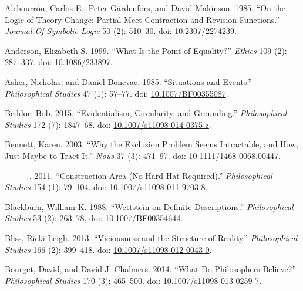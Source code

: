 \documentclass[
  10pt,
  letterpaper,
  DIV=11,
  numbers=noendperiod,
  twoside]{scrartcl}
\newlength{\cslhangindent}
\newenvironment{CSLReferences}[2] %
 {\begin{list}{}{%
  \setlength{\itemindent}{0pt}
  \setlength{\leftmargin}{0pt}
  \setlength{\parsep}{0pt}
  \ifodd #1
   \setlength{\leftmargin}{\cslhangindent}
   \setlength{\itemindent}{-1\cslhangindent}
  \fi
  \setlength{\itemsep}{#2\baselineskip}}}
 {\end{list}}
\begin{document}
\label{refs}
\begin{CSLReferences}{1}{0}
Alchourrón, Carlos E., Peter Gärdenfors, and David Makinson. 1985. {``On
the Logic of Theory Change: Partial Meet Contraction and Revision
Functions.''} \emph{Journal Of Symbolic Logic} 50 (2): 510--30. doi:
\href{https://doi.org/10.2307/2274239}{10.2307/2274239}.

Anderson, Elizabeth S. 1999. {``What Is the Point of Equality?''}
\emph{Ethics} 109 (2): 287--337. doi:
\href{https://doi.org/10.1086/233897}{10.1086/233897}.

Asher, Nicholas, and Daniel Bonevac. 1985. {``Situations and Events.''}
\emph{Philosophical Studies} 47 (1): 57--77. doi:
\href{https://doi.org/10.1007/BF00355087}{10.1007/BF00355087}.

Beddor, Bob. 2015. {``Evidentialism, Circularity, and Grounding.''}
\emph{Philosophical Studies} 172 (7): 1847--68. doi:
\href{https://doi.org/10.1007/s11098-014-0375-z}{10.1007/s11098-014-0375-z}.

Bennett, Karen. 2003. {``Why the Exclusion Problem Seems Intractable,
and How, Just Maybe to Tract It.''} \emph{Noûs} 37 (3): 471--97. doi:
\href{https://doi.org/10.1111/1468-0068.00447}{10.1111/1468-0068.00447}.

---------. 2011. {``Construction Area (No Hard Hat Required).''}
\emph{Philosophical Studies} 154 (1): 79--104. doi:
\href{https://doi.org/10.1007/s11098-011-9703-8}{10.1007/s11098-011-9703-8}.

Blackburn, William K. 1988. {``Wettstein on Definite Descriptions.''}
\emph{Philosophical Studies} 53 (2): 263--78. doi:
\href{https://doi.org/10.1007/BF00354644}{10.1007/BF00354644}.

Bliss, Ricki Leigh. 2013. {``Viciousness and the Structure of
Reality.''} \emph{Philosophical Studies} 166 (2): 399--418. doi:
\href{https://doi.org/10.1007/s11098-012-0043-0}{10.1007/s11098-012-0043-0}.

Bourget, David, and David J. Chalmers. 2014. {``What Do Philosophers
Believe?''} \emph{Philosophical Studies} 170 (3): 465--500. doi:
\href{https://doi.org/10.1007/s11098-013-0259-7}{10.1007/s11098-013-0259-7}.


\end{CSLReferences}
\end{document}
